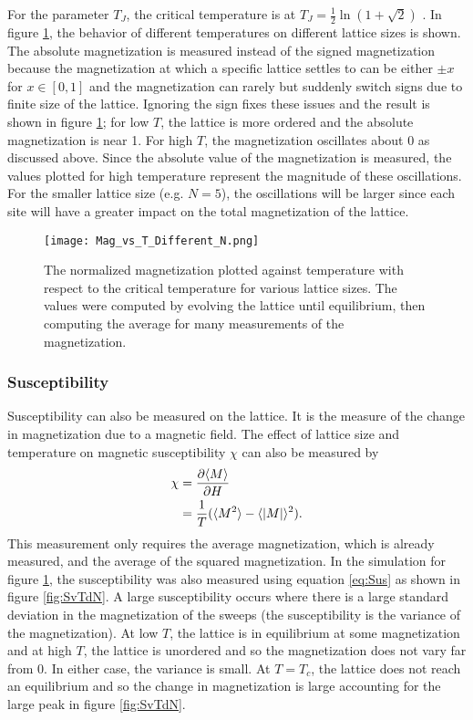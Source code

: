 \documentclass[11pt]{article}
\begin{document}
For the parameter $T_J$, the critical temperature is at $T_J=\frac{1}{2}\ln(1+\sqrt{2})$ \cite{IsingModelBook}. In figure \ref{fig:MvTdN}, the behavior of different temperatures on different lattice sizes is shown. The absolute magnetization is measured instead of the signed magnetization because the magnetization at which a specific lattice settles to can be either $\pm x$ for $x\in[0,1]$ and the magnetization can rarely but suddenly switch signs due to finite size of the lattice. Ignoring the sign fixes these issues and the result is shown in figure \ref{fig:MvTdN}; for low $T$, the lattice is more ordered and the absolute magnetization is near 1. For high $T$, the magnetization oscillates about 0 as discussed above. Since the absolute value of the magnetization is measured, the values plotted for high temperature represent the magnitude of these oscillations. For the smaller lattice size (e.g. $N=5$), the oscillations will be larger since each site will have a greater impact on the total magnetization of the lattice.

\begin{figure}[h]
	\centering
\texttt{[image: Mag\_vs\_T\_Different\_N.png]}
	\caption{The normalized magnetization plotted against temperature with respect to the critical temperature for various lattice sizes. The values were computed by evolving the lattice until equilibrium, then computing the average for many measurements of the magnetization.}
	\label{fig:MvTdN}
\end{figure}

\subsubsection{Susceptibility}

Susceptibility can also be measured on the lattice. It is the measure of the change in magnetization due to a magnetic field. The effect of lattice size and temperature on magnetic susceptibility $\chi$ can also be measured by \cite{IsingSus}
\begin{align}
	\chi&=\pdv{\langle M\rangle}{H}\\
	&=\frac{1}{T}(\langle M^2\rangle-\langle \abs{M}\rangle^2).
	\label{eq:Sus}
\end{align}
This measurement only requires the average magnetization, which is already measured, and the average of the squared magnetization. In the simulation for figure \ref{fig:MvTdN}, the susceptibility was also measured using equation \ref{eq:Sus} as shown in figure \ref{fig:SvTdN}. A large susceptibility occurs where there is a large standard deviation in the magnetization of the sweeps (the susceptibility is the variance of the magnetization). At low $T$, the lattice is in equilibrium at some magnetization and at high $T$, the lattice is unordered and so the magnetization does not vary far from 0. In either case, the variance is small. At $T=T_c$, the lattice does not reach an equilibrium and so the change in magnetization is large accounting for the large peak in figure \ref{fig:SvTdN}.
\end{document}

